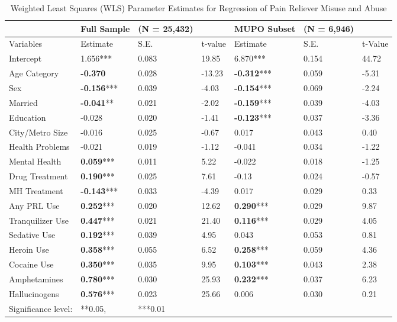 \documentclass[sigconf]{acmart}
\begin{document}
\begin{table*}[ht]
  \caption{Weighted Least Squares (WLS) Parameter Estimates for Regression 
  of Pain Reliever Misuse and Abuse}
  \label{tab:freq}
  \begin{tabular}{lllllll}
    \toprule
     & Full Sample& (N = 25,432)&& MUPO Subset& (N = 6,946)&  \\
    \midrule
    Variables & Estimate& S.E.& t-value& Estimate& S.E.& t-Value  \\
    \midrule
    Intercept& 1.656***& 0.083& 19.85& 6.870***& 0.154& 44.72 \\
    Age Category& \textbf{-0.370}& 0.028& -13.23& \textbf{-0.312}***& 0.059& -5.31 \\
    Sex& \textbf{-0.156}***& 0.039& -4.03& \textbf{-0.154}***& 0.069& -2.24  \\
    Married& \textbf{-0.041}**& 0.021& -2.02& \textbf{-0.159}***& 0.039& -4.03  \\
    Education& -0.028& 0.020& -1.41& \textbf{-0.123}***& 0.037& -3.36 \\
    City/Metro Size& -0.016& 0.025& -0.67& 0.017& 0.043& 0.40 \\
    Health Problems& -0.021& 0.019& -1.12& -0.041& 0.034& -1.22 \\
    Mental Health& \textbf{0.059}***& 0.011& 5.22& -0.022& 0.018& -1.25 \\
    Drug Treatment& \textbf{0.190}***& 0.025& 7.61& -0.13& 0.024& -0.57 \\
    MH Treatment& \textbf{-0.143}***& 0.033& -4.39& 0.017& 0.029& 0.33 \\
    Any PRL Use& \textbf{0.252}***& 0.020& 12.62& \textbf{0.290}***& 0.029& 9.87 \\
    Tranquilizer Use& \textbf{0.447}***& 0.021& 21.40& \textbf{0.116}***& 0.029& 4.05 \\
    Sedative Use& \textbf{0.192}***& 0.039& 4.95& 0.043& 0.053& 0.81 \\
    Heroin Use& \textbf{0.358}***& 0.055& 6.52& \textbf{0.258}***& 0.059& 4.36 \\
    Cocaine Use& \textbf{0.350}***& 0.035& 9.95& \textbf{0.103}***& 0.043& 2.38 \\
    Amphetamines& \textbf{0.780}***& 0.030& 25.93& \textbf{0.232}***& 0.037& 6.23 \\
    Hallucinogens& \textbf{0.576}***& 0.023& 25.66& 0.006& 0.030& 0.21 \\
    \bottomrule
    Significance level:& **0.05,& ***0.01&&&&
  \end{tabular}
\end{table*}
\end{document}
